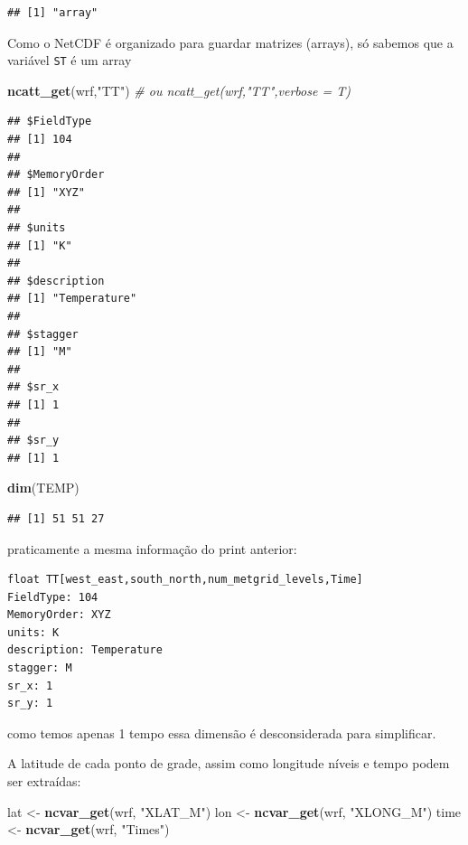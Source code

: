 \documentclass[]{book}
\newenvironment{Shaded}{\begin{snugshade}}{\end{snugshade}}
\newcommand{\KeywordTok}[1]{\textcolor[rgb]{0.13,0.29,0.53}{\textbf{#1}}}
\newcommand{\StringTok}[1]{\textcolor[rgb]{0.31,0.60,0.02}{#1}}
\newcommand{\CommentTok}[1]{\textcolor[rgb]{0.56,0.35,0.01}{\textit{#1}}}
\newcommand{\NormalTok}[1]{#1}
\begin{document}
\begin{verbatim}
## [1] "array"
\end{verbatim}

Como o NetCDF é organizado para guardar matrizes (arrays), só sabemos
que a variável \texttt{ST} é um array

\begin{Shaded}
\begin{Highlighting}[]
\KeywordTok{ncatt_get}\NormalTok{(wrf,}\StringTok{"TT"}\NormalTok{) }\CommentTok{# ou ncatt_get(wrf,"TT",verbose = T)}
\end{Highlighting}
\end{Shaded}

\begin{verbatim}
## $FieldType
## [1] 104
## 
## $MemoryOrder
## [1] "XYZ"
## 
## $units
## [1] "K"
## 
## $description
## [1] "Temperature"
## 
## $stagger
## [1] "M"
## 
## $sr_x
## [1] 1
## 
## $sr_y
## [1] 1
\end{verbatim}

\begin{Shaded}
\begin{Highlighting}[]
\KeywordTok{dim}\NormalTok{(TEMP)}
\end{Highlighting}
\end{Shaded}

\begin{verbatim}
## [1] 51 51 27
\end{verbatim}

praticamente a mesma informação do print anterior:

\begin{verbatim}
float TT[west_east,south_north,num_metgrid_levels,Time]   
FieldType: 104
MemoryOrder: XYZ
units: K
description: Temperature
stagger: M
sr_x: 1
sr_y: 1
\end{verbatim}

como temos apenas 1 tempo essa dimensão é desconsiderada para
simplificar.

A latitude de cada ponto de grade, assim como longitude níveis e tempo
podem ser extraídas:

\begin{Shaded}
\begin{Highlighting}[]
\NormalTok{lat  <-}\StringTok{ }\KeywordTok{ncvar_get}\NormalTok{(wrf, }\StringTok{"XLAT_M"}\NormalTok{)}
\NormalTok{lon  <-}\StringTok{ }\KeywordTok{ncvar_get}\NormalTok{(wrf, }\StringTok{"XLONG_M"}\NormalTok{)}
\NormalTok{time <-}\StringTok{ }\KeywordTok{ncvar_get}\NormalTok{(wrf, }\StringTok{"Times"}\NormalTok{)}
\end{Highlighting}
\end{Shaded}
\end{document}
